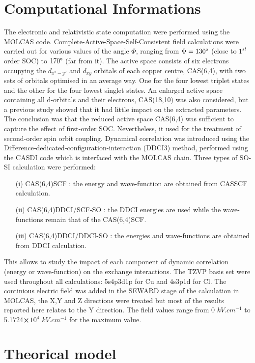\documentclass[10pt]{report}
\numberwithin{equation}{section}
\begin{document}
\section{Computational Informations}

The electronic and relativistic state computation were performed using the MOLCAS code.
Complete-Active-Space-Self-Consistent field calculations were carried out for various values of the angle $\Phi$, ranging from $\Phi=130\degree$ (close to $1^{st}$ order SOC) to $170\degree$ (far from it).
The active space consists of six electrons occupying the $d_{x^2-y^2}$ and $d_{xy}$ orbitals of each copper centre, CAS(6,4), with two sets of orbitals optimised in an average way.
One for the four lowest triplet states and the other for the four lowest singlet states.
An enlarged active space containing all d-orbitals and their electrons, CAS(18,10) was also considered, but a previous study showed that it had little impact on the extracted parameters. The conclusion was that the reduced active space CAS(6,4) was sufficient to capture the effect of first-order SOC.
Nevertheless, it used for the treatment of second-order spin orbit coupling.
Dynamical correlation was introduced using the Difference-dedicated-configuration-interaction (DDCI3) method, performed using the CASDI code which is interfaced with the MOLCAS chain.
Three types of SO-SI calculation were performed:
\begin{itemize}
    \item[(i)] CAS(6,4)SCF : the energy and wave-function are obtained from CASSCF calculation.
    \item[(ii)] CAS(6,4)DDCI/SCF-SO : the DDCI energies are used while the wave-functions remain that of the CAS(6,4)SCF.
    \item[(iii)] CAS(6,4)DDCI/DDCI-SO : the energies and wave-functions are obtained from DDCI calculation.
\end{itemize}
This allows to study the impact of each component of dynamic correlation (energy or wave-function) on the exchange interactions.
The TZVP basis set were used throughout all calculations: 5s4p3d1p for Cu and 4s3p1d for Cl.
The continious electric field was added in the SEWARD stage of the calculation in MOLCAS, the X,Y and Z directions were treated but most of the results reported here relates to the Y direction.
The field values range from 0 $kV.cm^{-1}$ to 5.1724$\cross$$10^4$ $kV.cm^{-1}$ for the maximum value.
\section{Theorical model}
\end{document}
